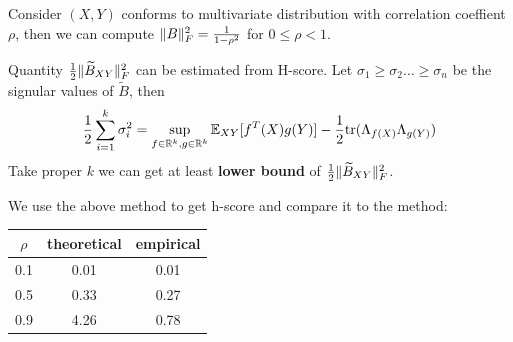\documentclass{article}
\begin{document}
\begin{example}\label{ex:rho}
Consider $(X,Y)$ conforms to multivariate distribution with correlation coeffient $\rho$, then
we can compute $\lVert B\rVert_F^2 = \frac{1}{1-\rho^2}$ for $0\leq \rho < 1 $.
\end{example}


Quantity ${1 \over 2} \lVert\widetilde{B}_{XY}\rVert_F^2$ can be estimated from H-score.
Let $\sigma_1 \geq \sigma_2 \dots \geq \sigma_n$ be the signular values of  $\widetilde{B}$,
then
\begin{equation}
{1 \over 2} \sum_{i=1}^k \sigma_i^2  = \displaystyle\sup_{f\in \mathbb{R}^k, g \in \mathbb{R}^k} \operatorname{\mathbb{E}}_{XY}[f^T(X)g(Y)]- {1 \over 2} \mathrm{tr}(\Lambda_{f(X)} \Lambda_{g(Y)})
\end{equation}
Take proper $k$ we can get at least \textbf{lower bound} of ${1 \over 2} \lVert\widetilde{B}_{XY}\rVert_F^2$.

We use the above method to get h-score and compare it to the method:

\begin{table}[!ht]
\centering
\begin{tabular}{ccc}
\hline
$\rho$ & theoretical & empirical \\
\hline
0.1 & 0.01 & 0.01 \\
0.5 & 0.33 & 0.27 \\
0.9 & 4.26 & 0.78 \\
\hline
\end{tabular}
\end{table}
\end{document}
